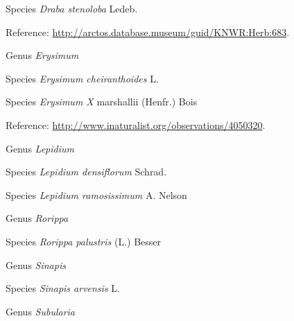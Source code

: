 \documentclass[9pt, article]{memoir}
\begin{document}
\begin{multicols}{2}
\vspace{6pt}\noindent\hspace{36pt}Species \textit{Draba stenoloba} Ledeb.


\vspace{6pt}Reference: 
\url{http://arctos.database.museum/guid/KNWR:Herb:683}.

\vspace{6pt}\noindent\hspace{30pt}Genus \textit{Erysimum}


\vspace{6pt}\noindent\hspace{36pt}Species \textit{Erysimum cheiranthoides} L.


\vspace{6pt}\noindent\hspace{36pt}Species \textit{Erysimum X} marshallii (Henfr.) Bois


\vspace{6pt}Reference: 
\url{http://www.inaturalist.org/observations/4050320}.

\vspace{6pt}\noindent\hspace{30pt}Genus \textit{Lepidium}


\vspace{6pt}\noindent\hspace{36pt}Species \textit{Lepidium densiflorum} Schrad.


\vspace{6pt}\noindent\hspace{36pt}Species \textit{Lepidium ramosissimum} A. Nelson


\vspace{6pt}\noindent\hspace{30pt}Genus \textit{Rorippa}


\vspace{6pt}\noindent\hspace{36pt}Species \textit{Rorippa palustris} (L.) Besser


\vspace{6pt}\noindent\hspace{30pt}Genus \textit{Sinapis}


\vspace{6pt}\noindent\hspace{36pt}Species \textit{Sinapis arvensis} L.


\vspace{6pt}\noindent\hspace{30pt}Genus \textit{Subularia}



\end{multicols}
\end{document}
